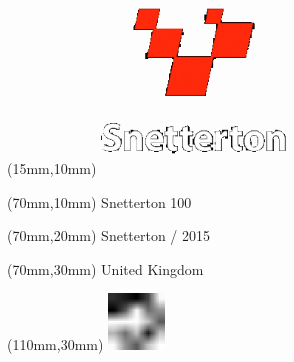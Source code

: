 \null\newpage
\begin{textblock*}{50mm}(15mm,10mm)%
\includegraphics[width=50mm]{LG/SNE.png}
\end{textblock*}
\begin{textblock*}{130mm}(70mm,10mm)%
{\fontsize{20}{20}\selectfont Snetterton 100}\\
\end{textblock*}
\begin{textblock*}{120mm}(70mm,20mm)%
{\fontsize{16}{16}\selectfont Snetterton / 2015}\\
\end{textblock*}
\begin{textblock*}{120mm}(70mm,30mm)%
{\fontsize{12}{12}\selectfont United Kingdom}
\end{textblock*}
\begin{textblock*}{30mm}(110mm,30mm)%
\centering
\includegraphics[height=15mm]{icons/fa-rotate-left.pdf}
\end{textblock*}
